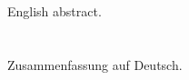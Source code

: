 
\chapter*{\abstractname}
\label{chap:abstract}
% 
% 
English abstract.
% 
% 

\chapter*{\abstractname}
% 
% 
Zusammenfassung auf Deutsch.
% 
% 

